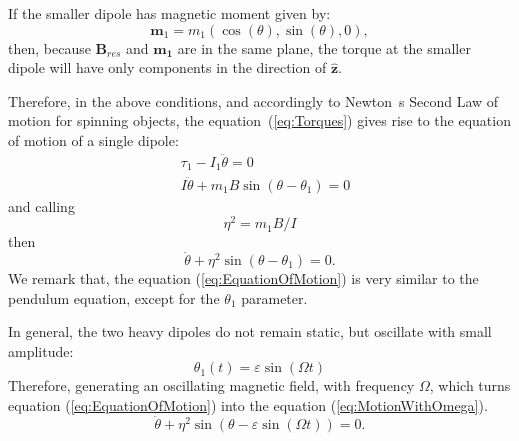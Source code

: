 If the smaller dipole has magnetic moment given by:
\begin{equation}
    \boldsymbol{m}_1 = m_1 (\cos(\theta), \sin(\theta), 0),
    \label{eq:MagneticMoment}
\end{equation}
then, because $\boldsymbol{B}_{res}$ and $\boldsymbol{m_1}$ are in the same plane, the torque at the smaller dipole will have only components in the direction of $\boldsymbol{\hat{z}}$.

Therefore, in the above conditions, and accordingly to Newton~\textquotesingle s Second Law of motion for spinning objects, the equation~(\ref{eq:Torques}) gives rise to the equation of motion of a single dipole:
\begin{equation}
    \begin{aligned}
        &\tau_1 - I_1 \ddot{\theta} = 0\\
        &I \ddot{\theta} + m_1 B \sin(\theta - \theta_1) = 0        
    \end{aligned}
\end{equation}
and calling
\begin{equation}
    \eta^2 = m_1 B/I 
\end{equation} 
then
\begin{equation}
    \ddot{\theta} +\eta^2 \sin(\theta - \theta_1) = 0.
    \label{eq:EquationOfMotion}
\end{equation}
We remark that, the equation (\ref{eq:EquationOfMotion}) is very similar to the pendulum equation, except for the $\theta_1$ parameter.


In general, the two heavy dipoles do not remain static, but oscillate with small amplitude:
\begin{equation}
    \theta_1(t) = \varepsilon \sin(\Omega t)
\end{equation}
Therefore, generating an oscillating magnetic field, with frequency $\Omega$, which turns equation (\ref{eq:EquationOfMotion}) into the equation (\ref{eq:MotionWithOmega}).
\begin{equation}
    \ddot{\theta} +\eta^2 \sin(\theta - \varepsilon \sin(\Omega t)) = 0.
    \label{eq:MotionWithOmega}
\end{equation}

